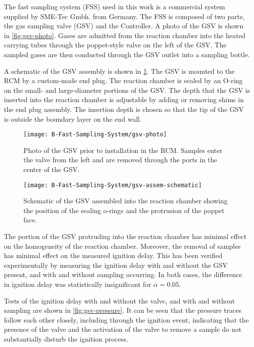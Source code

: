 \documentclass[../main.tex]{subfiles}
\begin{document}
The fast sampling system (FSS) used in this work is a commercial system supplied by
SME-Tec Gmbh. from Germany. The FSS is composed of two parts, the gas sampling valve
(GSV) and the Controller. A photo of the GSV is shown in \cref{fig:gsv-photo}.
Gases are admitted from the reaction chamber into the heated carrying tubes
through the poppet-style valve on the left of the GSV. The sampled gases are then
conducted through the GSV outlet into a sampling bottle.

A schematic of the GSV assembly is shown in \cref{fig:gsv-assem-schematic}.
The GSV is mounted to the RCM by a custom-made end plug. The reaction chamber
is sealed by an O-ring on the small- and large-diameter portions of the GSV.
The depth that the GSV is inserted into the reaction chamber is adjustable
by adding or removing shims in the end plug assembly. The insertion depth
is chosen so that the tip of the GSV is outside the boundary layer on the
end wall.

\begin{figure}
    \begin{floatrow}
        \ffigbox
            {\texttt{[image: B-Fast-Sampling-System/gsv-photo]}}
            {\caption{Photo of the GSV prior to installation in the RCM. Samples
            enter the valve from the left and are removed through the ports in the
            center of the GSV.}
            \label{fig:gsv-photo}}
        \ffigbox
            {\texttt{[image: B-Fast-Sampling-System/gsv-assem-schematic]}}
            {\caption{Schematic of the GSV assembled into the reaction chamber showing
            the position of the sealing o-rings and the protrusion of the poppet face.}
            \label{fig:gsv-assem-schematic}}
    \end{floatrow}
\end{figure}

The portion of the GSV protruding into the reaction chamber has minimal
effect on the homogeneity of the reaction chamber. Moreover, the removal of
samples has minimal effect on the measured ignition delay.
This has been verified experimentally by measuring the ignition delay with
and without the GSV present, and with and without sampling occurring.
In both cases, the difference in ignition delay was statistically insignificant
for $\alpha=0.05$.

Tests of the ignition delay with and without the valve, and with and
without sampling are shown in \cref{fig:gsv-pressure}. It can be seen
that the pressure traces follow each other closely, including through the
ignition event, indicating that the presence of the valve and the
activation of the valve to remove a sample do not substantially disturb
the ignition process.
\end{document}
